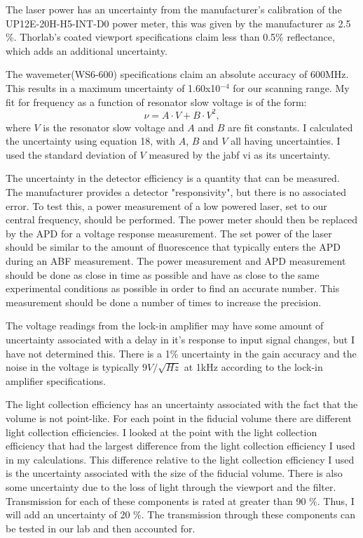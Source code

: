 \documentclass[12pt, a4paper]{article}
\begin{document}
The laser power has an uncertainty from the manufacturer's calibration of the UP12E-20H-H5-INT-D0 power meter, this was given by the manufacturer as 2.5 \%. Thorlab's coated viewport specifications claim less than 0.5\% reflectance, which adds an additional uncertainty.

The wavemeter(WS6-600) specifications claim an absolute accuracy of 600MHz. This results in a maximum uncertainty of 1.60x10$^{-4}$ for our scanning range. My fit for frequency as a function of resonator slow voltage is of the form:
\begin{equation}
\nu = A \cdot V + B \cdot V^2,
\end{equation}
where $V$ is the resonator slow voltage and $A$ and $B$ are fit constants. I calculated the uncertainty using equation 18, with $A$, $B$ and $V$ all having uncertainties. I used the standard deviation of $V$ measured by the jabf vi as its uncertainty.

The uncertainty in the detector efficiency is a quantity that can be measured. The manufacturer provides a detector "responsivity", but there is no associated error. To test this, a power measurement of a low powered laser, set to our central frequency, should be performed. The power meter should then be replaced by the APD for a voltage response measurement. The set power of the laser should be similar to the amount of fluorescence that typically enters the APD during an ABF measurement. The power measurement and APD measurement should be done as close in time as possible and have as close to the same experimental conditions as possible in order to find an accurate number. This measurement should be done a number of times to increase the precision.

The voltage readings from the lock-in amplifier may have some amount of uncertainty associated with a delay in it's response to input signal changes, but I have not determined this. There is a 1\% uncertainty in the gain accuracy and the noise in the voltage is typically $9V/\sqrt{Hz}$ at 1kHz according to the lock-in amplifier specifications. 

The light collection efficiency has an uncertainty associated with the fact that the volume is not point-like. For each point in the fiducial volume there are different light collection efficiencies. I looked at the point with the light collection efficiency that had the largest difference from the light collection efficiency I used in my calculations. This difference relative to the light collection efficiency I used is the uncertainty associated with the size of the fiducial volume. There is also some uncertainty due to the loss of light through the viewport and the filter. Transmission for each of these components is rated at greater than 90 \%. Thus, I will add an uncertainty of 20 \%. The transmission through these components can be tested in our lab and then accounted for. 
\end{document}
